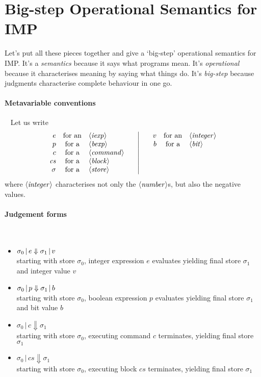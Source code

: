 \documentclass{article}
\begin{document}
\section{Big-step Operational Semantics for IMP}


\newcommand{\execJ}[3]{#1 \,|\, #2 \Downarrow #3}
\newcommand{\cs}{\mathit{cs}}
\newcommand{\cmp}{\mathit{cmp}}
\newcommand{\fbx}[1]{\framebox{\ensuremath{#1}}}

Let's put all these pieces together and give a `big-step' operational semantics for IMP. It's a \emph{semantics} because it says what programs mean. It's \emph{operational} because it characterises meaning by saying what things do. It's \emph{big-step} because judgments characterise complete behaviour in one go.

\paragraph{Metavariable conventions}~ Let us write
\[\begin{array}{rcl@{\qquad}|@{\qquad}rcl}
    e & \mbox{for an} & \NT{iexp} & v & \mbox{for an} & \NT{integer} \\
    p & \mbox{for a} & \NT{bexp} & b & \mbox{for a} & \NT{bit} \\
    c & \mbox{for a} & \NT{command} & & & \\
    \cs & \mbox{for a} & \NT{block} & & & \\
    \sigma & \mbox{for a} & \NT{store} &&&\\
\end{array}\]
where $\langle \mathit{integer} \rangle$ characterises not only the $\langle \mathit{number} \rangle$s, but also the negative values.

\paragraph{Judgement forms}~
\begin{itemize}
\item $\sigma_0 \,|\, e \Downarrow \sigma_1 \,|\, v$\\
  starting with store $\sigma_0$, integer expression $e$ evaluates yielding final store $\sigma_1$ and integer value $v$
\item $\sigma_0 \,|\, p \Downarrow \sigma_1 \,|\, b$\\
  starting with store $\sigma_0$, boolean expression $p$ evaluates yielding final store $\sigma_1$ and bit value $b$
\item $\execJ{\sigma_0}{c}{\sigma_1}$\\
  starting with store $\sigma_0$, executing command $c$ terminates, yielding final store $\sigma_1$ 
\item $\execJ{\sigma_0}{\cs}{\sigma_1}$\\
  starting with store $\sigma_0$, executing block $\cs$ terminates, yielding final store $\sigma_1$ 
\end{itemize}
\end{document}
